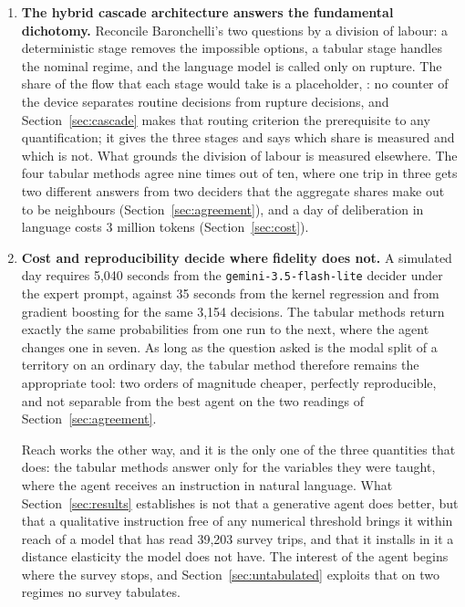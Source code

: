 \begin{enumerate}
\item \textbf{The hybrid cascade architecture answers the fundamental dichotomy.} Reconcile Baronchelli's two questions by a division of labour: a deterministic stage removes the impossible options, a tabular stage handles the nominal regime, and the language model is called only on rupture. The share of the flow that each stage would take is a placeholder, : no counter of the device separates routine decisions from rupture decisions, and Section~\ref{sec:cascade} makes that routing criterion the prerequisite to any quantification; it gives the three stages and says which share is measured and which is not. What grounds the division of labour is measured elsewhere. The four tabular methods agree nine times out of ten, where one trip in three gets two different answers from two deciders that the aggregate shares make out to be neighbours (Section~\ref{sec:agreement}), and a day of deliberation in language costs 3 million tokens (Section~\ref{sec:cost}).

\item \textbf{Cost and reproducibility decide where fidelity does not.} A simulated day requires 5{,}040 seconds from the \texttt{gemini-3.5-flash-lite} decider under the expert prompt, against 35 seconds from the kernel regression and from gradient boosting for the same 3{,}154 decisions. The tabular methods return exactly the same probabilities from one run to the next, where the agent changes one in seven. As long as the question asked is the modal split of a territory on an ordinary day, the tabular method therefore remains the appropriate tool: two orders of magnitude cheaper, perfectly reproducible, and not separable from the best agent on the two readings of Section~\ref{sec:agreement}.

Reach works the other way, and it is the only one of the three quantities that does: the tabular methods answer only for the variables they were taught, where the agent receives an instruction in natural language. What Section~\ref{sec:results} establishes is not that a generative agent does better, but that a qualitative instruction free of any numerical threshold brings it within reach of a model that has read 39{,}203 survey trips, and that it installs in it a distance elasticity the model does not have. The interest of the agent begins where the survey stops, and Section~\ref{sec:untabulated} exploits that on two regimes no survey tabulates.

\end{enumerate}
